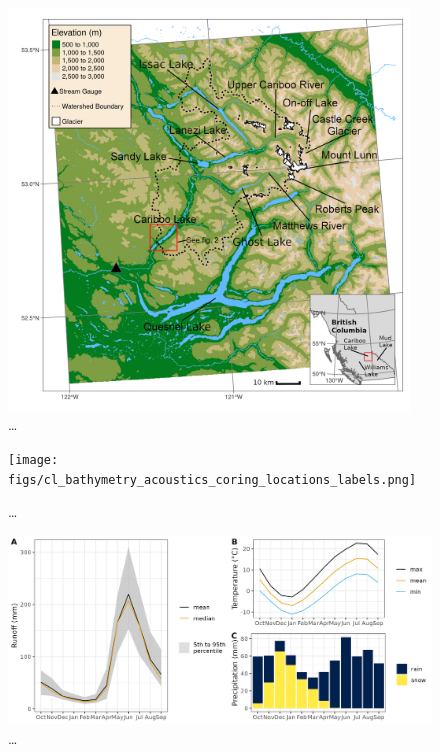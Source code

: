 \documentclass[
  letterpaper,
  DIV=11,
  numbers=noendperiod]{scrartcl}
\begin{document}
\begin{figure}

{\centering \includegraphics[width=0.95\textwidth,height=\textheight]{figs/cl_small_scale_inset_labels_gimp.png}

}

\caption{\label{fig-map-basin}\ldots{}}

\end{figure}

\begin{figure}

{\centering \texttt{[image: figs/cl\_bathymetry\_acoustics\_coring\_locations\_labels.png]}

}

\caption{\label{fig-map-lake}\ldots{}}

\end{figure}

\begin{figure}

{\centering \includegraphics[width=1\textwidth,height=\textheight]{figs/cariboo_combine_climate_hydro.png}

}

\caption{\label{fig-cl-hydro}\ldots{}}

\end{figure}
\end{document}
